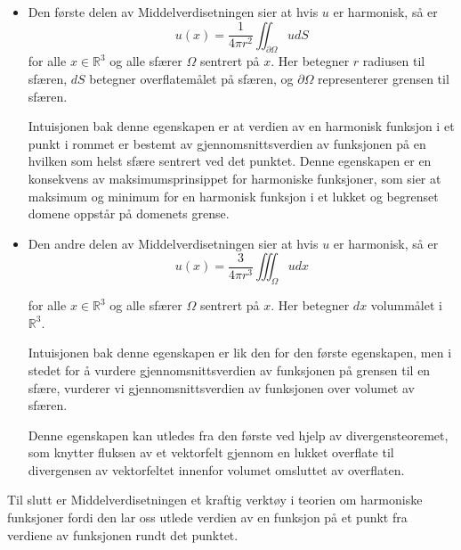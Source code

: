 \begin{itemize}
\item Den første delen av Middelverdisetningen sier at hvis $u$ er harmonisk, så er
\begin{equation*}
u(x) = \frac{1}{4 \pi r^{2}} \iint_{\partial \Omega} u d S
\end{equation*}
for alle $x \in \mathbb{R}^{3}$ og alle sfærer $\Omega$ sentrert på $x$. Her betegner $r$ radiusen til sfæren, $dS$ betegner overflatemålet på sfæren, og $\partial \Omega$ representerer grensen til sfæren.

Intuisjonen bak denne egenskapen er at verdien av en harmonisk funksjon i et punkt i rommet er bestemt av gjennomsnittsverdien av funksjonen på en hvilken som helst sfære sentrert ved det punktet. Denne egenskapen er en konsekvens av maksimumsprinsippet for harmoniske funksjoner, som sier at maksimum og minimum for en harmonisk funksjon i et lukket og begrenset domene oppstår på domenets grense.

\item Den andre delen av Middelverdisetningen sier at hvis $u$ er harmonisk, så er
\begin{equation*}
u(x) = \frac{3}{4 \pi r^{3}} \iiint_{\Omega} u d x
\end{equation*}

for alle $x \in \mathbb{R}^{3}$ og alle sfærer $\Omega$ sentrert på $x$. Her betegner $dx$ volummålet i $\mathbb{R}^{3}$.

Intuisjonen bak denne egenskapen er lik den for den første egenskapen, men i stedet for å vurdere gjennomsnittsverdien av funksjonen på grensen til en sfære, vurderer vi gjennomsnittsverdien av funksjonen over volumet av sfæren.

Denne egenskapen kan utledes fra den første ved hjelp av divergensteoremet, som knytter fluksen av et vektorfelt gjennom en lukket overflate til divergensen av vektorfeltet innenfor volumet omsluttet av overflaten.
\end{itemize}

Til slutt er Middelverdisetningen et kraftig verktøy i teorien om harmoniske funksjoner fordi den lar oss utlede verdien av en funksjon på et punkt fra verdiene av funksjonen rundt det punktet.